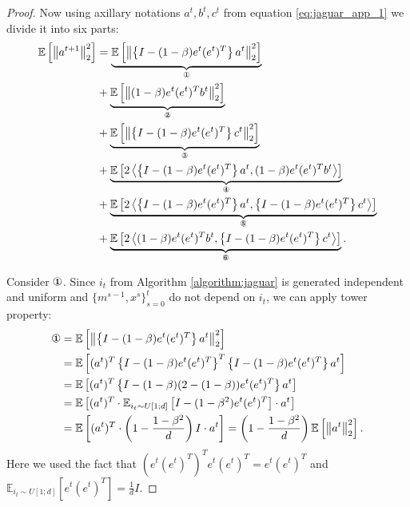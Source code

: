 \documentclass{article}
\theoremstyle{plain}
\theoremstyle{definition}
\theoremstyle{remark}
\newcommand{\expect}[1]{\mathbb{E}\left[ #1 \right]}
\newcommand{\norm}[1]{\left\| #1 \right\|}
\newcommand{\EEb}[2]{\mathbb{E}_{#1}\left[ #2 \right]}
\newcommand{\dotprod}[2]{\left\langle #1,#2 \right\rangle}
\newcommand{\circledOne}{\text{\ding{172}}}
\newcommand{\circledTwo}{\text{\ding{173}}}
\newcommand{\circledThree}{\text{\ding{174}}}
\newcommand{\circledFour}{\text{\ding{175}}}
\newcommand{\circledFive}{\text{\ding{176}}}
\newcommand{\circledSix}{\text{\ding{177}}}
\begin{document}
\begin{proof}
        Now using axillary notations $a^t, b^t, c^t$ from equation \eqref{eq:jaguar_app_1} we divide it into six parts:
        \begin{equation}
        \label{eq:jaguar_app_2}
        \begin{split}
            \expect{\norm{a^{t+1}}_2^2} 
            &=
            \underbrace{\expect{\norm{
                \left\{I - (1-\beta)e^t (e^t)^T \right\} a^t}_2^2}}_{\circledOne}
            \\&+
            \underbrace{\expect{\norm{
                (1 - \beta) e^t (e^t)^T b^t}_2^2}}_{\circledTwo}
            \\&+
            \underbrace{\expect{\norm{
                \left\{I - (1-\beta)e^t (e^t)^T \right\} c^t}_2^2}}_{\circledThree}
            \\&+
            \underbrace{\expect{2\dotprod{
                \left\{I - (1-\beta)e^t (e^t)^T \right\} a^t
            }{
                (1 - \beta) e^t (e^t)^T b^t
            }}}_{\circledFour}
            \\&+
            \underbrace{\expect{2\dotprod{
                \left\{I - (1-\beta)e^t (e^t)^T \right\} a^t
            }{
                \left\{I - (1-\beta)e^t (e^t)^T \right\} c^t
            }}}_{\circledFive}
            \\&+
            \underbrace{\expect{2\dotprod{
                (1 - \beta) e^t (e^t)^T b^t
            }{
                \left\{I - (1-\beta)e^t (e^t)^T \right\} c^t
            }}}_{\circledSix}.
        \end{split}
        \end{equation}

        Consider $\circledOne$. Since $i_t$ from Algorithm \ref{algorithm:jaguar} is generated independent and uniform and $\{m^{s-1}, x^s\}_{s=0}^{t}$ do not depend on $i_t$, we can apply tower property:
        \begin{align}
        \label{eq:jaguar_circ1}
            \circledOne &= \expect{\norm{
                \left\{I - (1-\beta)e^t (e^t)^T \right\} a^t
            }_2^2}
            \nonumber
            \\&=
            \expect{
                (a^t)^T \left\{I - (1-\beta)e^t (e^t)^T \right\}^T \left\{I - (1-\beta)e^t (e^t)^T \right\} a^t
            }
            \nonumber
            \\&=
            \expect{
                (a^t)^T \left\{I - (1-\beta) (2 - (1-\beta)) e^t (e^t)^T \right\} a^t
            }
            \nonumber
            \\&=
            \expect{
                (a^t)^T \cdot \EEb{i_t \sim U[1; d]}{I - (1-\beta^2) e^t (e^t)^T} \cdot  a^t
            }
            \nonumber
            \\&=
            \expect{
                (a^t)^T \cdot \left(1 - \frac{1 - \beta^2}{d} \right) I \cdot  a^t
            }
            =
            \left(1 - \frac{1 - \beta^2}{d} \right) \expect{\norm{a^t}_2^2}.
        \end{align}
        Here we used the fact that $\left(e^t (e^t)^T\right)^T e^t (e^t)^T = e^t (e^t)^T$ and $\EEb{i_t \sim U[1; d]}{e^t (e^t)^T} = \frac{1}{d} I$.


\end{proof}
\end{document}
